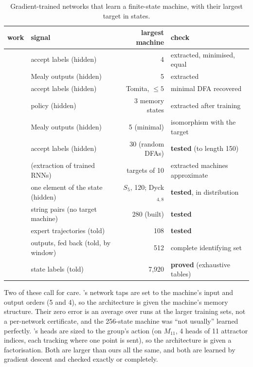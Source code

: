 \documentclass[11pt]{article}
\begin{document}
\begin{table}[h]
\centering
\small
\begin{tabularx}{\textwidth}{Xlrl}
\toprule
work & signal & largest machine & check \\
\midrule
\citet{zeng-1993-self-clustering-recurrent-networks} & accept labels (hidden) & 4 & extracted, minimised, equal \\
\citet{tino-1995-learning-extracting-initial-mealy-automata} & Mealy outputs (hidden) & 5 & extracted \\
\citet{wang-2019-state-regularized-rnns} & accept labels (hidden) & Tomita, $\le 5$ & minimal DFA recovered \\
\citet{koul-2019-finite-state-recurrent-policies} & policy (hidden) & 3 memory states & extracted after training \\
\citet{aichernig-2024-learning-minimal-automata-rnn} & Mealy outputs (hidden) & 5 (minimal) & isomorphism with the target \\
\citet{umili-2024-deepdfa-automata-learning-probabilistic-relaxations} & accept labels (hidden) & 30 (random DFAs) & \textbf{tested} (to length 150) \\
\citet{weiss-2018-extracting-automata-queries-counterexamples} & (extraction of trained RNNs) & targets of 10 & extracted machines approximate \\
\citet{liu-2022-transformers-shortcuts-automata} & one element of the state (hidden) & $S_5$, 120; Dyck$_{4,8}$ & \textbf{tested}, in distribution \\
\citet{ginn-2026-neural-induction-finite-state-transducers} & string pairs (no target machine) & 280 (built) & \textbf{tested} \\
\citet{papazov-2025-exact-learning-arithmetic-differentiable-agents} & expert trajectories (told) & 108 & \textbf{tested} \\
\citet{giles-1995-learning-class-large-finite-state-machines} & outputs, fed back (told, by window) & 512 & complete identifying set \\
\citet{brandoit-2026-length-independent-state-tracking} & state labels (told) & 7{,}920 & \textbf{proved} (exhaustive tables) \\
\bottomrule
\end{tabularx}
\caption{Gradient-trained networks that learn a finite-state machine, with their largest target in
states.}
\label{tab:literature}
\end{table}

Two of these call for care. \citeauthor{giles-1995-learning-class-large-finite-state-machines}'s
network taps are set to the machine's input and output orders (5 and 4), so the architecture is given
the machine's memory structure. Their zero error is an average over runs at the larger training sets,
not a per-network certificate, and the 256-state machine was ``not usually'' learned perfectly.
\citeauthor{brandoit-2026-length-independent-state-tracking}'s heads are sized to the group's action
(on $M_{11}$, 4 heads of 11 attractor indices, each tracking where one point is sent), so the
architecture is given a factorisation. Both are larger than ours all the same, and both are learned
by gradient descent and checked exactly or completely.
\end{document}
